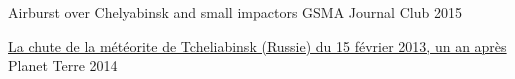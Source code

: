 
\begin{cvhonors}

	\cvhonor
		{Airburst over Chelyabinsk and small impactors}
		{}
		{GSMA Journal Club}
		{2015}

	\cvhonor
		{\href{{http://planet-terre.ens-lyon.fr/article/meteorite-Tcheliabinsk.xml}}{La chute de la météorite de Tcheliabinsk (Russie) du 15 février 2013, un an après}}
		{}
		{Planet Terre}
		{2014}

\end{cvhonors}
